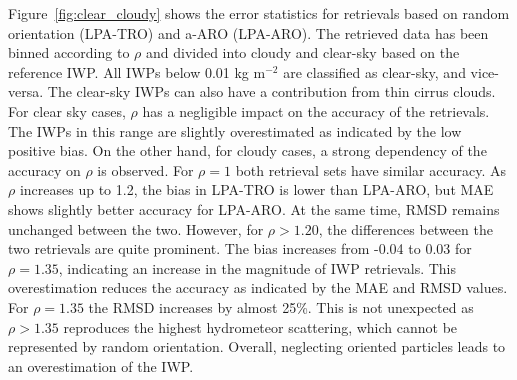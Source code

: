 \documentclass[amt, manuscript]{copernicus}
\begin{document}
Figure~\ref{fig:clear_cloudy} shows the error statistics for retrievals based on random orientation (LPA-TRO) and a-ARO (LPA-ARO). The retrieved data has been binned according to $\rho$ and divided into cloudy and clear-sky based on the reference IWP.  All IWPs below 0.01\,\,kg m$^{-2}$ are classified as clear-sky, and vice-versa. The clear-sky IWPs can also have a contribution from thin cirrus clouds. For clear sky cases, $\rho$ has a negligible impact on the accuracy of the retrievals. The IWPs in this range are slightly overestimated as indicated by the low positive bias. On the other hand, for cloudy cases, a strong dependency of the accuracy on $\rho$ is observed. For $\rho = 1$ both retrieval sets have similar accuracy. As $\rho$ increases up to 1.2, the bias in LPA-TRO is lower than LPA-ARO, but MAE shows slightly better accuracy for LPA-ARO. At the same time, RMSD remains unchanged between the two. However, for $\rho > 1.20$, the differences between the two retrievals are quite prominent. The bias increases from -0.04 to 0.03 for $\rho = 1.35$, indicating an increase in the magnitude of IWP retrievals. This overestimation reduces the accuracy as indicated by the MAE and RMSD values. For $\rho = 1.35$ the RMSD increases by almost 25\%. This is  not unexpected as $\rho > 1.35$ reproduces the highest hydrometeor scattering, which cannot be represented by random orientation. Overall, neglecting oriented particles leads to an overestimation of the IWP. 



\end{document}
